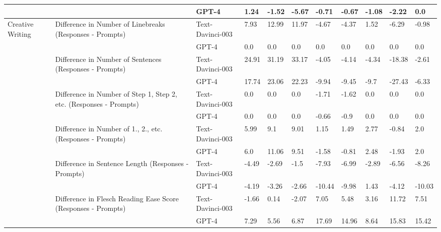 \begin{tabular}{x{0.75cm}|x{1.5cm}|x{0.75cm}|x{0.75cm}|x{0.75cm}|x{0.75cm}|x{0.75cm}|x{0.75cm}|x{0.75cm}|x{0.75cm}|x{0.75cm}}
\hline
 &  & GPT-4 & 1.24 & -1.52 & -5.67 & -0.71 & -0.67 & -1.08 & -2.22 & 0.0 \\
\hline
Creative Writing & Difference in Number of Linebreaks (Responses - Prompts) & Text-Davinci-003 & 7.93 & 12.99 & 11.97 & -4.67 & -4.37 & 1.52 & -6.29 & -0.98 \\
\hline
 &  & GPT-4 & 0.0 & 0.0 & 0.0 & 0.0 & 0.0 & 0.0 & 0.0 & 0.0 \\
\hline
 & Difference in Number of Sentences (Responses - Prompts) & Text-Davinci-003 & 24.91 & 31.19 & 33.17 & -4.05 & -4.14 & -4.34 & -18.38 & -2.61 \\
\hline
 &  & GPT-4 & 17.74 & 23.06 & 22.23 & -9.94 & -9.45 & -9.7 & -27.43 & -6.33 \\
\hline
 & Difference in Number of Step 1, Step 2, etc. (Responses - Prompts) & Text-Davinci-003 & 0.0 & 0.0 & 0.0 & -1.71 & -1.62 & 0.0 & 0.0 & 0.0 \\
\hline
 &  & GPT-4 & 0.0 & 0.0 & 0.0 & -0.66 & -0.9 & 0.0 & 0.0 & 0.0 \\
\hline
 & Difference in Number of 1., 2., etc. (Responses - Prompts) & Text-Davinci-003 & 5.99 & 9.1 & 9.01 & 1.15 & 1.49 & 2.77 & -0.84 & 2.0 \\
\hline
 &  & GPT-4 & 6.0 & 11.06 & 9.51 & -1.58 & -0.81 & 2.48 & -1.93 & 2.0 \\
\hline
 & Difference in Sentence Length (Responses - Prompts) & Text-Davinci-003 & -4.49 & -2.69 & -1.5 & -7.93 & -6.99 & -2.89 & -6.56 & -8.26 \\
\hline
 &  & GPT-4 & -4.19 & -3.26 & -2.66 & -10.44 & -9.98 & 1.43 & -4.12 & -10.03 \\
\hline
 & Difference in Flesch Reading Ease Score (Responses - Prompts) & Text-Davinci-003 & -1.66 & 0.14 & -2.07 & 7.05 & 5.48 & 3.16 & 11.72 & 7.51 \\
\hline
 &  & GPT-4 & 7.29 & 5.56 & 6.87 & 17.69 & 14.96 & 8.64 & 15.83 & 15.42 \\
\hline
\bottomrule
\end{tabular}
